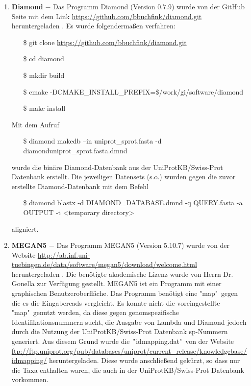 \documentclass[10pt, a4paper]{report}[08.12.2015]
\begin{document}
\begin{enumerate}
          
          \item \textbf{Diamond} $-$ Das Programm Diamond (Version 0.7.9) 				  \cite{buchfink2014} wurde 
          von der GitHub Seite mit dem Link
          \url{https://github.com/bbuchfink/diamond.git} heruntergeladen
          . Es wurde folgenderma\ss{en} verfahren:
          \begin{itemize}
            \item[\$] git clone 															\url{https://github.com/bbuchfink/diamond.git}
            \item[\$] cd diamond
            \item[\$] mkdir build
            \item[\$] cmake 																-DCMAKE\_INSTALL\_PREFIX=\$/work/gi/software/diamond
            \item[\$] make install
		  \end{itemize}
		  Mit dem Aufruf
		  \begin{itemize}
		    \item[\$] diamond makedb --in uniprot\_sprot.fasta -d 							diamonduniprot\_sprot.fasta.dmnd
		  \end{itemize}
		  wurde die bin\"are Diamond-Datenbank aus der UniProtKB/Swiss-Prot
		  Datenbank erstellt.\newline
		  Die jeweiligen Datensets (s.o.) wurden gegen die zuvor erstellte 				  Diamond-Datenbank mit dem Befehl
		  \begin{itemize}
		    \item[\$] diamond blastx -d DIAMOND\_DATABASE.dmnd -q QUERY.fasta 			-a OUTPUT -t <temporary directory> 
		  \end{itemize}
		  aligniert.		             
          
          \item \textbf{MEGAN5} $-$ Das Programm MEGAN5 (Version 5.10.7) 				  \cite{huson2011} wurde von der Website \url{http://ab.inf.uni-									  tuebingen.de/data/software/megan5/download/welcome.html}
          heruntergeladen . Die ben\"otigte akademische
          Lizenz wurde von Herrn Dr. Gonella zur Verf\"ugung 
          gestellt. MEGAN5 ist ein Programm mit einer graphischen 						  Benutzeroberfl\"ache. Das Programm ben\"otigt eine "map"\ gegen die
          es die Eingabereads vergleicht. Es konnte nicht die 				  		  voreingestellte "map"\ genutzt werden, da diese gegen genomspezifische Identifikationsnummern sucht, die Ausgabe von Lambda und Diamond jedoch durch die Nutzung der UniProtKB/Swiss-Prot Datenbank sp-Nummern generiert. Aus diesem Grund wurde die $"$idmapping.dat"\ 				  von der Website 									\url{ftp://ftp.uniprot.org/pub/databases/uniprot/current_release/knowledgebase/idmapping/} 		  heruntergeladen. Diese wurde anschlie{\ss}end gek\"urzt, so dass 				  nur die Taxa enthalten waren, die auch in der UniProtKB/Swiss-Prot 			  Datenbank vorkommen. 
          

\end{enumerate}
\end{document}
